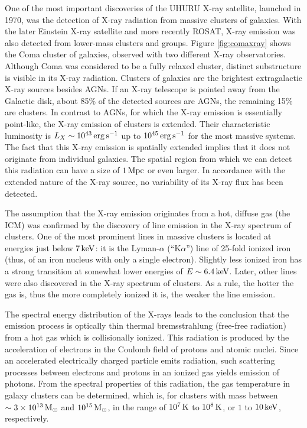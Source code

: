 \documentclass[a4paper,10pt]{article}
\begin{document}
{\noindent}One of the most important discoveries of the UHURU X-ray satellite, launched in 1970, was the detection of X-ray radiation from massive clusters of galaxies. With the later Einstein X-ray satellite and more recently ROSAT, X-ray emission was also detected from lower-mass clusters and groups. Figure \ref{fig:comaxray} shows the Coma cluster of galaxies, observed with two different X-ray observatories. Although Coma was considered to be a fully relaxed cluster, distinct substructure is visible in its X-ray radiation. Clusters of galaxies are the brightest extragalactic X-ray sources besides AGNs. If an X-ray telescope is pointed away from the Galactic disk, about 85\% of the detected sources are AGNs, the remaining 15\% are clusters. In contrast to AGNs, for which the X-ray emission is essentially point-like, the X-ray emission of clusters is extended. Their characteristic luminosity is $L_X\sim10^{43}\,{\rm erg\,s^{-1}}$ up to $10^{45}\,{\rm erg\,s^{-1}}$ for the most massive systems. The fact that this X-ray emission is spatially extended implies that it does not originate from individual galaxies. The spatial region from which we can detect this radiation can have a size of $1\,{\rm Mpc}$ or even larger. In accordance with the extended nature of the X-ray source, no variability of its X-ray flux has been detected.

{\noindent}The assumption that the X-ray emission originates from a hot, diffuse gas (the ICM) was confirmed by the discovery of line emission in the X-ray spectrum of clusters. One of the most prominent lines in massive clusters is located at energies just below $7\,{\rm keV}$: it is the Lyman-$\alpha$ (``K$\alpha$'') line of 25-fold ionized iron (thus, of an iron nucleus with only a single electron). Slightly less ionized iron has a strong transition at somewhat lower energies of $E\sim6.4\,{\rm keV}$. Later, other lines were also discovered in the X-ray spectrum of clusters. As a rule, the hotter the gas is, thus the more completely ionized it is, the weaker the line emission. 

{\noindent}The spectral energy distribution of the X-rays leads to the conclusion that the emission process is optically thin thermal bremsstrahlung (free-free radiation) from a hot gas which is collisionally ionized. This radiation is produced by the acceleration of electrons in the Coulomb field of protons and atomic nuclei. Since an accelerated electrically charged particle emits radiation, such scattering processes between electrons and protons in an ionized gas yields emission of photons. From the spectral properties of this radiation, the gas temperature in galaxy clusters can be determined, which is, for clusters with mass between $\sim3\times10^{13}\,{\rm M_\odot}$ and $10^{15}\,{\rm M_\odot}$, in the range of $10^7\,{\rm K}$ to $10^8\,{\rm K}$, or $1$ to $10\,{\rm keV}$, respectively.
\end{document}

